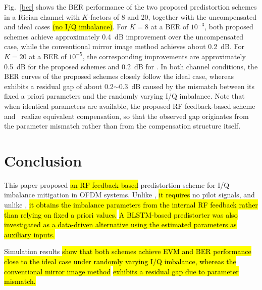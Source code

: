 \documentclass[lettersize,journal]{IEEEtran}
\begin{document}
Fig.~\ref{ber} shows the BER performance of the two proposed predistortion schemes in a Rician channel with $K$-factors of 8 and 20, together with the uncompensated and ideal cases \hl{(no I/Q imbalance)}.
For $K = 8$ at a BER of $10^{-3}$, both proposed schemes achieve approximately 0.4~dB improvement over the uncompensated case, while the conventional mirror image method \cite{Mirror_Image} achieves about 0.2~dB.
For $K = 20$ at a BER of $10^{-5}$, the corresponding improvements are approximately 0.5~dB for the proposed schemes and 0.2~dB for \cite{Mirror_Image}.
In both channel conditions, the BER curves of the proposed schemes closely follow the ideal case, whereas \cite{Mirror_Image} exhibits a residual gap of about 0.2$\sim$0.3~dB caused by the mismatch between its fixed a priori parameters and the randomly varying I/Q imbalance.
Note that when identical parameters are available, the proposed RF feedback-based scheme and~\cite{Mirror_Image} realize equivalent compensation, so that the observed gap originates from the parameter mismatch rather than from the compensation structure itself.


\section{Conclusion}

This paper proposed \hl{an RF feedback-based} predistortion scheme for I/Q imbalance mitigation in OFDM systems.
Unlike \cite{REF7, REF8, REF9}, \hl{it requires} no pilot signals, and unlike \cite{Mirror_Image}, \hl{it obtains the imbalance parameters from the internal RF
feedback rather than relying on fixed a priori values.}
\hl{A BLSTM-based predistorter was also investigated as a data-driven alternative using the estimated parameters as auxiliary inputs.}

Simulation results \hl{show that both schemes achieve EVM and BER performance close to the ideal case under randomly varying I/Q imbalance, whereas the conventional mirror image method} \cite{Mirror_Image} \hl{exhibits a residual gap due to parameter mismatch.}
\end{document}
